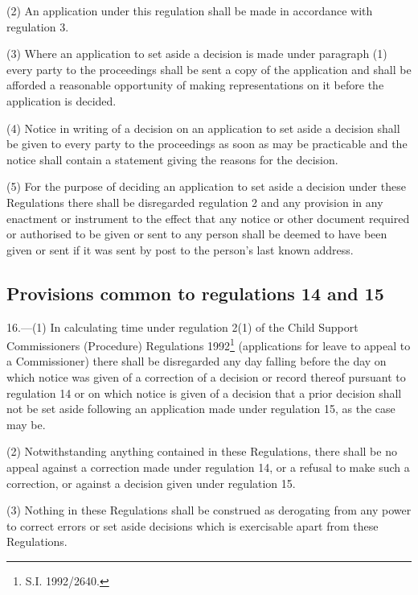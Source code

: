 \documentclass[12pt,a4paper]{article}
\begin{document}
(2) An application under this regulation shall be made in accordance with regulation 3.

(3) Where an application to set aside a decision is made under paragraph (1) every party to the proceedings shall be sent a copy of the application and shall be afforded a reasonable opportunity of making representations on it before the application is decided.

(4) Notice in writing of a decision on an application to set aside a decision shall be given to every party to the proceedings as soon as may be practicable and the notice shall contain a statement giving the reasons for the decision.

(5) For the purpose of deciding an application to set aside a decision under these Regulations there shall be disregarded regulation 2 and any provision in any enactment or instrument to the effect that any notice or other document required or authorised to be given or sent to any person shall be deemed to have been given or sent if it was sent by post to the person’s last known address.


\subsection[16. Provisions common to regulations 14 and 15]{Provisions common to regulations 14 and 15}

16.—(1) In calculating time under regulation 2(1) of the Child Support Commissioners (Procedure) Regulations 1992\footnote{\frenchspacing S.I. 1992/2640.} (applications for leave to appeal to a Commissioner) there shall be disregarded any day falling before the day on which notice was given of a correction of a decision or record thereof pursuant to regulation 14 or on which notice is given of a decision that a prior decision shall not be set aside following an application made under regulation 15, as the case may be.

(2) Notwithstanding anything contained in these Regulations, there shall be no appeal against a correction made under regulation 14, or a refusal to make such a correction, or against a decision given under regulation 15.

(3) Nothing in these Regulations shall be construed as derogating from any power to correct errors or set aside decisions which is exercisable apart from these Regulations.
\end{document}
